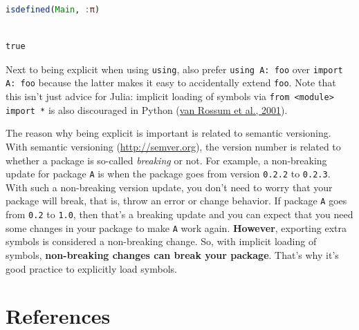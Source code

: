\documentclass[
  notoc %
]{tufte-book}
\newcommand{\passthrough}[1]{#1}
\begin{document}
\begin{lstlisting}[language=Julia]
isdefined(Main, :π)
\end{lstlisting}

\begin{lstlisting}[language=Output]

true

\end{lstlisting}

Next to being explicit when using \passthrough{\lstinline!using!}, also
prefer \passthrough{\lstinline!using A: foo!} over
\passthrough{\lstinline!import A: foo!} because the latter makes it easy
to accidentally extend \passthrough{\lstinline!foo!}. Note that this
isn't just advice for Julia: implicit loading of symbols via
\passthrough{\lstinline!from <module> import *!} is also discouraged in
Python (\protect\hyperlink{ref-pep8}{van Rossum et al., 2001}).

The reason why being explicit is important is related to semantic
versioning. With semantic versioning (\url{http://semver.org}), the
version number is related to whether a package is so-called
\emph{breaking} or not. For example, a non-breaking update for package
\passthrough{\lstinline!A!} is when the package goes from version
\passthrough{\lstinline!0.2.2!} to \passthrough{\lstinline!0.2.3!}. With
such a non-breaking version update, you don't need to worry that your
package will break, that is, throw an error or change behavior. If
package \passthrough{\lstinline!A!} goes from
\passthrough{\lstinline!0.2!} to \passthrough{\lstinline!1.0!}, then
that's a breaking update and you can expect that you need some changes
in your package to make \passthrough{\lstinline!A!} work again.
\textbf{However}, exporting extra symbols is considered a non-breaking
change. So, with implicit loading of symbols, \textbf{non-breaking
changes can break your package}. That's why it's good practice to
explicitly load symbols.

\hypertarget{references}{%
\chapter*{References}\label{references}}
\end{document}
